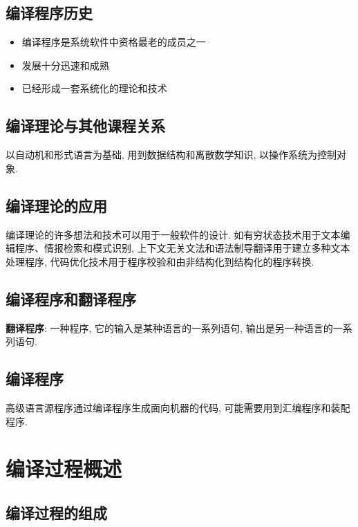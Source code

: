     \subsection{编译程序历史}

        \begin{itemize}
            \item 编译程序是系统软件中资格最老的成员之一
            \item 发展十分迅速和成熟
            \item 已经形成一套系统化的理论和技术
        \end{itemize}

    \subsection{编译理论与其他课程关系}

        以自动机和形式语言为基础, 用到数据结构和离散数学知识, 以操作系统为控制对象.

    \subsection{编译理论的应用}

        编译理论的许多想法和技术可以用于一般软件的设计. 如有穷状态技术用于文本编辑程序、情报检索和模式识别, 上下文无关文法和语法制导翻译用于建立多种文本处理程序, 代码优化技术用于程序校验和由非结构化到结构化的程序转换.

    \subsection{编译程序和翻译程序}

        \textbf{翻译程序}: 一种程序, 它的输入是某种语言的一系列语句, 输出是另一种语言的一系列语句.

    \subsection{编译程序}

        高级语言源程序通过编译程序生成面向机器的代码, 可能需要用到汇编程序和装配程序.

\section{编译过程概述}

    \subsection{编译过程的组成}

